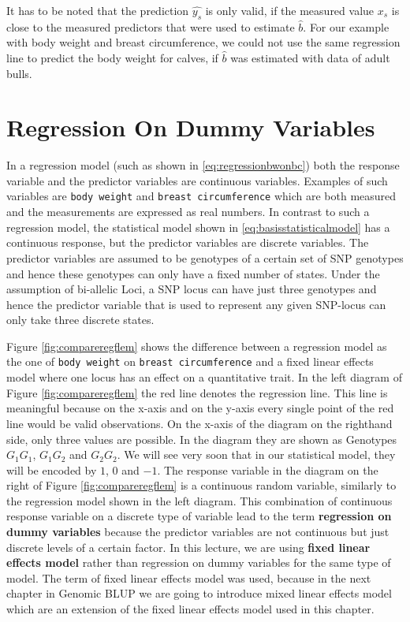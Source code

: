 \documentclass[]{book}
\theoremstyle{definition}
\theoremstyle{definition}
\theoremstyle{definition}
\theoremstyle{remark}
\begin{document}
It has to be noted that the prediction \(\widehat{y_s}\) is only valid, if the measured value \(x_s\) is close to the measured predictors that were used to estimate \(\hat{b}\). For our example with body weight and breast circumference, we could not use the same regression line to predict the body weight for calves, if \(\hat{b}\) was estimated with data of adult bulls.

\hypertarget{asm-flem-reg-dummy}{%
\section{Regression On Dummy Variables}\label{asm-flem-reg-dummy}}

In a regression model (such as shown in \eqref{eq:regressionbwonbc}) both the response variable and the predictor variables are continuous variables. Examples of such variables are \texttt{body\ weight} and \texttt{breast\ circumference} which are both measured and the measurements are expressed as real numbers. In contrast to such a regression model, the statistical model shown in \eqref{eq:basisstatisticalmodel} has a continuous response, but the predictor variables are discrete variables. The predictor variables are assumed to be genotypes of a certain set of SNP genotypes and hence these genotypes can only have a fixed number of states. Under the assumption of bi-allelic Loci, a SNP locus can have just three genotypes and hence the predictor variable that is used to represent any given SNP-locus can only take three discrete states.

Figure \ref{fig:compareregflem} shows the difference between a regression model as the one of \texttt{body\ weight} on \texttt{breast\ circumference} and a fixed linear effects model where one locus has an effect on a quantitative trait. In the left diagram of Figure \ref{fig:compareregflem} the red line denotes the regression line. This line is meaningful because on the x-axis and on the y-axis every single point of the red line would be valid observations. On the x-axis of the diagram on the righthand side, only three values are possible. In the diagram they are shown as Genotypes \(G_1G_1\), \(G_1G_2\) and \(G_2G_2\). We will see very soon that in our statistical model, they will be encoded by \(1\), \(0\) and \(-1\). The response variable in the diagram on the right of Figure \ref{fig:compareregflem} is a continuous random variable, similarly to the regression model shown in the left diagram. This combination of continuous response variable on a discrete type of variable lead to the term \textbf{regression on dummy variables} because the predictor variables are not continuous but just discrete levels of a certain factor. In this lecture, we are using \textbf{fixed linear effects model} rather than regression on dummy variables for the same type of model. The term of fixed linear effects model was used, because in the next chapter in Genomic BLUP we are going to introduce mixed linear effects model which are an extension of the fixed linear effects model used in this chapter.
\end{document}
